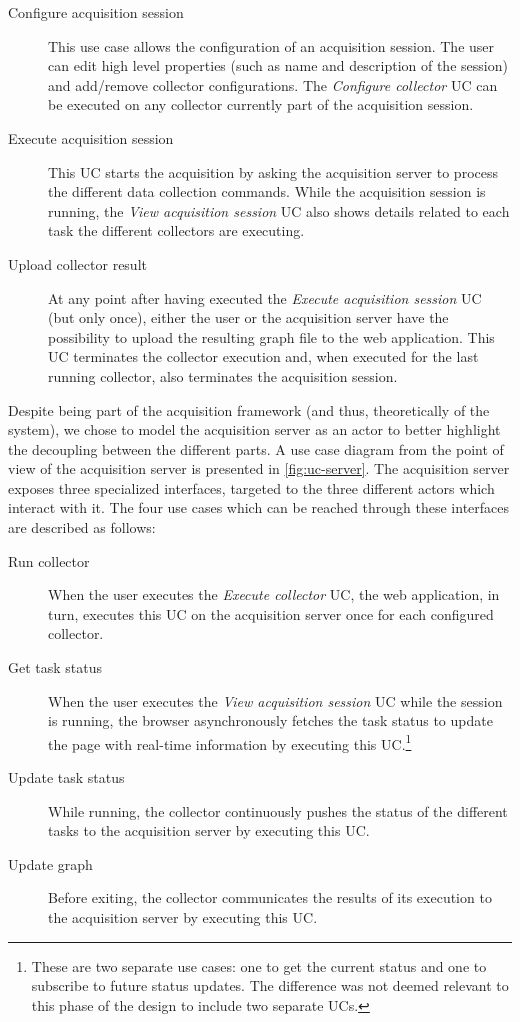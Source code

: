 \begin{description}
  \item[Configure acquisition session] This use case allows the configuration of an acquisition session. The user can edit high level properties (such as name and description of the session) and add/remove collector configurations. The \emph{Configure collector} UC can be executed on any collector currently part of the acquisition session.
  \item[Execute acquisition session] This UC starts the acquisition by asking the acquisition server to process the different data collection commands. While the acquisition session is running, the \emph{View acquisition session} UC also shows details related to each task the different collectors are executing.
  \item[Upload collector result] At any point after having executed the \emph{Execute acquisition session} UC (but only once), either the user or the acquisition server have the possibility to upload the resulting graph file to the web application. This UC terminates the collector execution and, when executed for the last running collector, also terminates the acquisition session.
\end{description}

Despite being part of the acquisition framework (and thus, theoretically of the system), we chose to model the acquisition server as an actor to better highlight the decoupling between the different parts. A use case diagram from the point of view of the acquisition server is presented in \vref{fig:uc-server}. The acquisition server exposes three specialized interfaces, targeted to the three different actors which interact with it. The four use cases which can be reached through these interfaces are described as follows:

\begin{description}
  \item[Run collector] When the user executes the \emph{Execute collector} UC, the web application, in turn, executes this UC on the acquisition server once for each configured collector.
  \item[Get task status] When the user executes the \emph{View acquisition session} UC while the session is running, the browser asynchronously fetches the task status to update the page with real-time information by executing this UC.\footnote{These are two separate use cases: one to get the current status and one to subscribe to future status updates. The difference was not deemed relevant to this phase of the design to include two separate UCs.}
  \item[Update task status] While running, the collector continuously pushes the status of the different tasks to the acquisition server by executing this UC.
  \item[Update graph] Before exiting, the collector communicates the results of its execution to the acquisition server by executing this UC.
\end{description}

